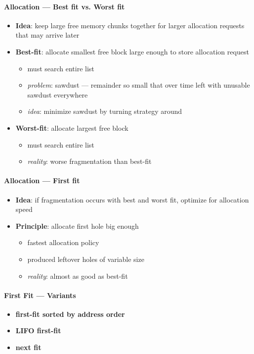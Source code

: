 \paragraph{Allocation --- Best fit vs. Worst fit}
\begin{itemize}
  \item \textbf{Idea}: keep large free memory chunks together for larger allocation requests that may arrive later
  \item \textbf{Best-fit}: allocate smallest free block large enough to store allocation request
  \begin{itemize}
    \item must search entire list
    \item \emph{problem}: sawdust --- remainder so small that over time left with unusable sawdust everywhere
    \item \emph{idea}: minimize sawdust by turning strategy around
  \end{itemize}
  \item \textbf{Worst-fit}: allocate largest free block
  \begin{itemize}
    \item must search entire list
    \item \emph{reality}: worse fragmentation than best-fit
  \end{itemize}
\end{itemize}

\paragraph{Allocation --- First fit}
\begin{itemize}
  \item \textbf{Idea}: if fragmentation occurs with best and worst fit, optimize for allocation speed
  \item \textbf{Principle}: allocate first hole big enough
  \begin{itemize}
    \item fastest allocation policy
    \item produced leftover holes of variable size
    \item \emph{reality}: almost as good as best-fit
  \end{itemize}
\end{itemize}

\paragraph{First Fit --- Variants}
\begin{itemize}
  \item \textbf{first-fit sorted by address order}
  \item \textbf{LIFO first-fit}
  \item \textbf{next fit}
\end{itemize}

